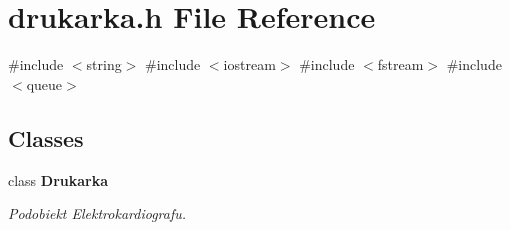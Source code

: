 \section{drukarka.\+h File Reference}
\label{drukarka_8h}
{\ttfamily \#include $<$string$>$}\newline
{\ttfamily \#include $<$iostream$>$}\newline
{\ttfamily \#include $<$fstream$>$}\newline
{\ttfamily \#include $<$queue$>$}\newline
\subsection*{Classes}
\begin{DoxyCompactItemize}
\item 
class \textbf{ Drukarka}
\begin{DoxyCompactList}\small\item\em Podobiekt Elektrokardiografu. \end{DoxyCompactList}\end{DoxyCompactItemize}
